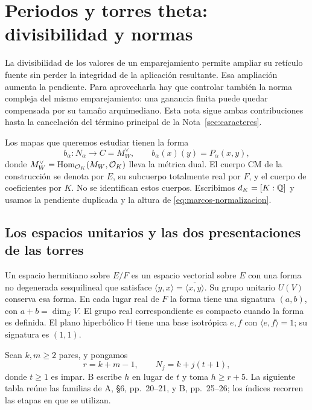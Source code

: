 \section{Periodos y torres theta: divisibilidad y normas}
\label{sec:periodos}


La divisibilidad de los valores de un emparejamiento permite ampliar
su retículo fuente sin perder la integridad de la aplicación resultante.
Esa ampliación aumenta la pendiente. Para aprovecharla hay que controlar
también la norma compleja del mismo emparejamiento: una ganancia finita
puede quedar compensada por su tamaño arquimediano. Esta nota sigue
ambas contribuciones hasta la cancelación del término principal de la
Nota~\ref{sec:caracteres}.

Los mapas que queremos estudiar tienen la forma
\begin{equation}
 b_\alpha:N_\alpha\longrightarrow C=M_W^\vee,
 \qquad b_\alpha(x)(y)=P_\alpha(x,y),
 \label{eq:periodos-mapa}
\end{equation}
donde $M_W^\vee=\operatorname{Hom}_{\mathcal{O}_K}(M_W,\mathcal{O}_K)$ lleva la métrica dual.
El cuerpo CM de la construcción se denota por $E$, su subcuerpo
totalmente real por $F$, y el cuerpo de coeficientes por $K$.
No se identifican estos cuerpos. Escribimos $d_K=[K:\mathbb{Q}]$ y usamos
la pendiente duplicada y la altura de
\eqref{eq:marcos-normalizacion}.

\subsection{Los espacios unitarios y las dos presentaciones de las torres}

Un espacio hermitiano sobre $E/F$ es un espacio vectorial sobre $E$
con una forma no degenerada sesquilineal que satisface
$\langle y,x\rangle=\overline{\langle x,y\rangle}$.
Su grupo unitario $U(V)$ conserva esa forma. En cada lugar real de $F$
la forma tiene una signatura $(a,b)$, con $a+b=\dim_E V$.
El grupo real correspondiente es compacto cuando la forma es definida.
El plano hiperbólico $\mathbb H$ tiene una base isotrópica $e,f$ con
$\langle e,f\rangle=1$; su signatura es $(1,1)$.

Sean $k,m\ge2$ pares, y pongamos
\[
 r=k+m-1,\qquad N_j=k+j(t+1),
\]
donde $t\ge1$ es impar. B escribe $h$ en lugar de $t$ y toma
$h\ge r+5$. La siguiente tabla reúne las familias de A, §6, pp.~20--21,
y B, pp.~25--26; los índices recorren las etapas en que se utilizan.

